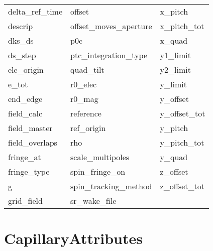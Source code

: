 \begin{tabular}{lll}
delta_ref_time              & offset                      & x_pitch                     \\
descrip                     & offset_moves_aperture       & x_pitch_tot                 \\
dks_ds                      & p0c                         & x_quad                      \\
ds_step                     & ptc_integration_type        & y1_limit                    \\
ele_origin                  & quad_tilt                   & y2_limit                    \\
e_tot                       & r0_elec                     & y_limit                     \\
end_edge                    & r0_mag                      & y_offset                    \\
field_calc                  & reference                   & y_offset_tot                \\
field_master                & ref_origin                  & y_pitch                     \\
field_overlaps              & rho                         & y_pitch_tot                 \\
fringe_at                   & scale_multipoles            & y_quad                      \\
fringe_type                 & spin_fringe_on              & z_offset                    \\
g                           & spin_tracking_method        & z_offset_tot                \\
grid_field                  & sr_wake_file                &                             \\
 \bottomrule
 \end{tabular}
 \vfill
 
 \section{CapillaryAttributes}
 \label{s:list.capillary}
 
